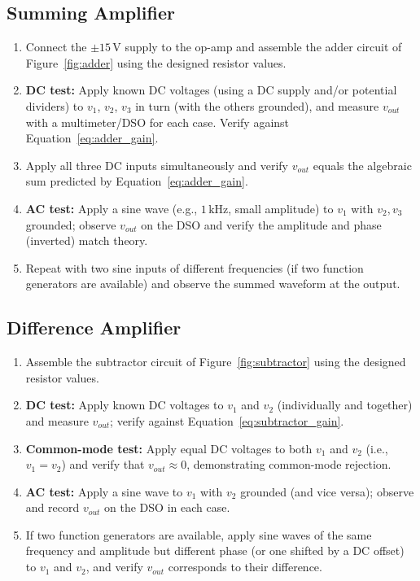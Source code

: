 \subsection{Summing Amplifier}
\begin{enumerate}[label=\arabic*.]
	\item Connect the $\pm 15\,\text{V}$ supply to the op-amp and assemble the adder circuit of Figure~\ref{fig:adder} using the designed resistor values.
	\item \textbf{DC test:} Apply known DC voltages (using a DC supply and/or potential dividers) to $v_1$, $v_2$, $v_3$ in turn (with the others grounded), and measure $v_{out}$ with a multimeter/DSO for each case. Verify against Equation~\eqref{eq:adder_gain}.
	\item Apply all three DC inputs simultaneously and verify $v_{out}$ equals the algebraic sum predicted by Equation~\eqref{eq:adder_gain}.
	\item \textbf{AC test:} Apply a sine wave (e.g., $1\,\text{kHz}$, small amplitude) to $v_1$ with $v_2, v_3$ grounded; observe $v_{out}$ on the DSO and verify the amplitude and phase (inverted) match theory.
	\item Repeat with two sine inputs of different frequencies (if two function generators are available) and observe the summed waveform at the output.
\end{enumerate}

\subsection{Difference Amplifier}
\begin{enumerate}[label=\arabic*.]
	\item Assemble the subtractor circuit of Figure~\ref{fig:subtractor} using the designed resistor values.
	\item \textbf{DC test:} Apply known DC voltages to $v_1$ and $v_2$ (individually and together) and measure $v_{out}$; verify against Equation~\eqref{eq:subtractor_gain}.
	\item \textbf{Common-mode test:} Apply equal DC voltages to both $v_1$ and $v_2$ (i.e., $v_1 = v_2$) and verify that $v_{out} \approx 0$, demonstrating common-mode rejection.
	\item \textbf{AC test:} Apply a sine wave to $v_1$ with $v_2$ grounded (and vice versa); observe and record $v_{out}$ on the DSO in each case.
	\item If two function generators are available, apply sine waves of the same frequency and amplitude but different phase (or one shifted by a DC offset) to $v_1$ and $v_2$, and verify $v_{out}$ corresponds to their difference.
\end{enumerate}

